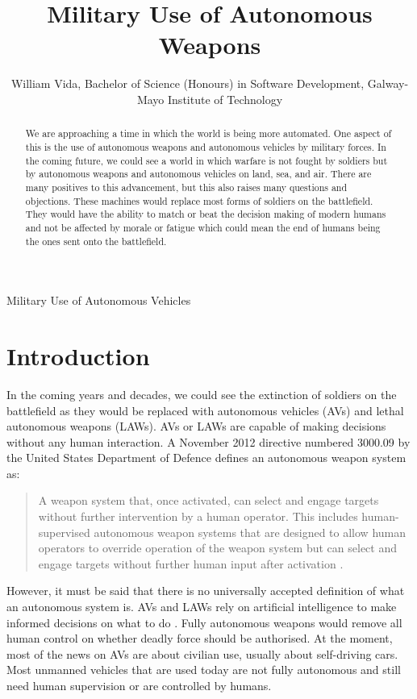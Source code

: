 \documentclass[journal]{IEEEtran}
\begin{document}
{Military Use of Autonomous Vehicles}

\title{Military Use of Autonomous Weapons}
\author{William Vida, Bachelor of Science (Honours) in Software Development, Galway-Mayo Institute of Technology}

\maketitle
    
\begin{abstract}
	We are approaching a time in which the world is being more automated. One aspect of this is the use of autonomous weapons and autonomous vehicles by military forces. In the coming future, we could see a world in which warfare is not fought by soldiers but by autonomous weapons and autonomous vehicles on land, sea, and air. There are many positives to this advancement, but this also raises many questions and objections. These machines would replace most forms of soldiers on the battlefield. They would have the ability to match or beat the decision making of modern humans and not be affected by morale or fatigue which could mean the end of humans being the ones sent onto the battlefield.
\end{abstract}

\section{Introduction}
In the coming years and decades, we could see the extinction of soldiers on the battlefield as they would be replaced with autonomous vehicles (AVs) and lethal autonomous weapons (LAWs). AVs or LAWs are capable of making decisions without any human interaction. A November 2012 directive numbered 3000.09 by the United States Department of Defence defines an autonomous weapon system as:
\begin{quote}
	A weapon system that, once activated, can select and engage targets without further intervention by a human operator. This includes human-supervised autonomous weapon systems that are designed to allow human operators to override operation of the weapon system but can select and engage targets without further human input after activation \cite{us2012autonomy} \cite{anderson2013law}.
\end{quote}
However, it must be said that there is no universally accepted definition of what an autonomous system is. AVs and LAWs rely on artificial intelligence to make informed decisions on what to do \cite{taeihagh2019governing}. Fully autonomous weapons would remove all human control on whether deadly force should be authorised. At the moment, most of the news on AVs are about civilian use, usually about self-driving cars. Most unmanned vehicles that are used today are not fully autonomous and still need human supervision or are controlled by humans.
\end{document}
